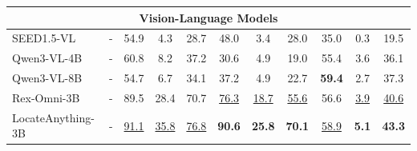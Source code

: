 \begin{table}[t]
{\begin{tabular}{l|c|ccc|ccc|ccc}
\multicolumn{11}{c}{{Vision-Language Models}} \\
\midrule
SEED1.5-VL~\citep{guo2025seed15vltechnicalreport} & -
& 54.9 & 4.3 & 28.7
& 48.0 & 3.4 & 28.0
& 35.0 & 0.3 & 19.5 \\
Qwen3-VL-4B~\citep{bai2025qwen3vltechnicalreport} & -
& 60.8 & 8.2 & 37.2
& 30.6 & 4.9 & 19.0
& 55.4 & 3.6 & 36.1 \\
Qwen3-VL-8B~\citep{bai2025qwen3vltechnicalreport} & -
& 54.7 & 6.7 & 34.1
& 37.2 & 4.9 & 22.7
& \textbf{59.4} & 2.7 & 37.3 \\
Rex-Omni-3B~\citep{jiang2025rexomni} & -
& 89.5 & 28.4 & 70.7
& \underline{76.3} & \underline{18.7} & \underline{55.6}
& 56.6 & \underline{3.9} & \underline{40.6} \\
\rowcolor{lightblue!10}
LocateAnything-3B & -
& \underline{91.1} & \underline{35.8} & \underline{76.8}
& \textbf{90.6} & \textbf{25.8} & \textbf{70.1}
& \underline{58.9} & \textbf{5.1} & \textbf{43.3} \\
\bottomrule
        \end{tabular}
    }
    \label{tab:layout_ocr_merged}
\end{table}
